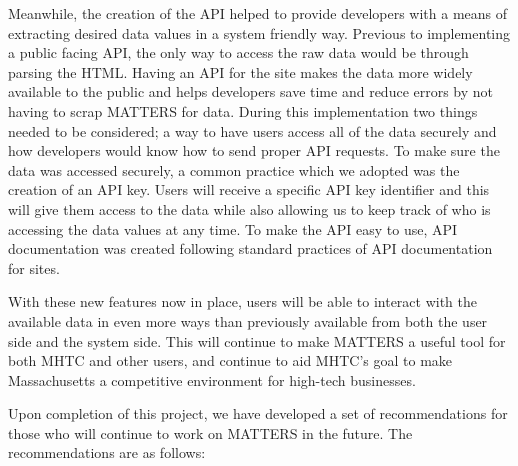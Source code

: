 Meanwhile, the creation of the API helped to provide developers with a means of extracting desired data values in a system friendly way. Previous to implementing a public facing API, the only way to access the raw data would be through parsing the HTML. Having an API for the site makes the data more widely available to the public and helps developers save time and reduce errors by not having to scrap MATTERS for data. During this implementation two things needed to be considered; a way to have users access all of the data securely and how developers would know how to send proper API requests. To make sure the data was accessed securely, a common practice which we adopted was the creation of an API key. Users will receive a specific API key identifier and this will give them access to the data while also allowing us to keep track of who is accessing the data values at any time. To make the API easy to use, API documentation was created following standard practices of API documentation for sites.
 
With these new features now in place, users will be able to interact with the available data in even more ways than previously available from both the user side and the system side. This will continue to make MATTERS a useful tool for both MHTC and other users, and continue to aid MHTC's goal to make Massachusetts a competitive environment for high-tech businesses.
 
Upon completion of this project, we have developed a set of recommendations for those who will continue to work on MATTERS in the future. The recommendations are as follows:
 
